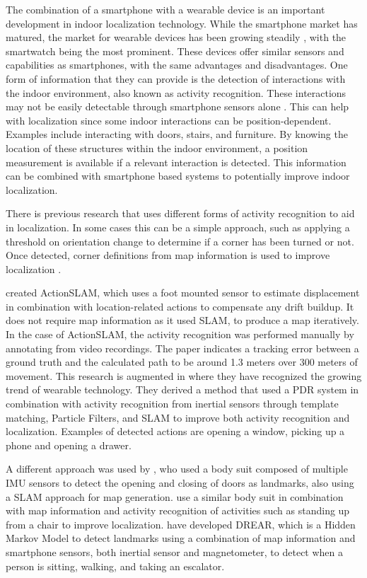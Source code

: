 The combination of a smartphone with a wearable device is an important development in indoor localization technology. While the smartphone market has matured, the market for wearable devices has been growing steadily \cite{jung2016consumer}, with the smartwatch being the most prominent. These devices offer similar sensors and capabilities as smartphones, with the same advantages and disadvantages. One form of information that they can provide is the detection of interactions with the indoor environment, also known as activity recognition. These interactions may not be easily detectable through smartphone sensors alone \cite{Shoaib2015}. This can help with localization since some indoor interactions can be position-dependent. Examples include interacting with doors, stairs, and furniture. By knowing the location of these structures within the indoor environment, a position measurement is available if a relevant interaction is detected. This information can be combined with smartphone based systems to potentially improve indoor localization.

There is previous research that uses different forms of activity recognition to aid in localization. In some cases this can be a simple approach, such as applying a threshold on orientation change to determine if a corner has been turned or not. Once detected, corner definitions from map information is used to improve localization \cite{Gu2019,Jackermeier2018}. \par 
\citet{Hardegger2012} created ActionSLAM, which uses a foot mounted sensor to estimate displacement in combination with location-related actions to compensate any drift buildup. It does not require map information as it used \ac{SLAM}, to produce a map iteratively. In the case of ActionSLAM, the activity recognition was performed manually by annotating from video recordings. The paper indicates a tracking error between a ground truth and the calculated path to be around 1.3 meters over 300 meters of movement. This research is augmented in \citet{Hardegger2016} where they have recognized the growing trend of wearable technology. They derived a method that used a \ac{PDR} system in combination with activity recognition from inertial sensors through template matching, Particle Filters, and \ac{SLAM} to improve both activity recognition and localization. Examples of detected actions are opening a window, picking up a phone and opening a drawer. \par
A different approach was used by \citet{Grzonka2010}, who used a body suit composed of multiple \ac{IMU} sensors to detect the opening and closing of doors as landmarks, also using a \ac{SLAM} approach for map generation. \citet{Altun2012} use a similar body suit in combination with map information and activity recognition of activities such as standing up from a chair to improve localization. \citet{Torok2014} have developed DREAR, which is a Hidden Markov Model to detect landmarks using a combination of map information and smartphone sensors, both inertial sensor and magnetometer, to detect when a person is sitting, walking, and taking an escalator.

